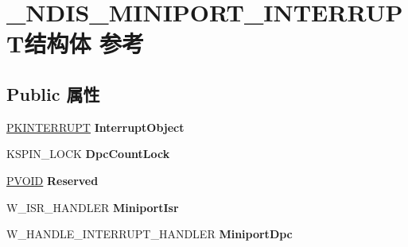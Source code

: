 \hypertarget{struct___n_d_i_s___m_i_n_i_p_o_r_t___i_n_t_e_r_r_u_p_t}{}\section{\+\_\+\+N\+D\+I\+S\+\_\+\+M\+I\+N\+I\+P\+O\+R\+T\+\_\+\+I\+N\+T\+E\+R\+R\+U\+P\+T结构体 参考}
\label{struct___n_d_i_s___m_i_n_i_p_o_r_t___i_n_t_e_r_r_u_p_t}
\subsection*{Public 属性}
\begin{DoxyCompactItemize}
\item 
\mbox{\label{struct___n_d_i_s___m_i_n_i_p_o_r_t___i_n_t_e_r_r_u_p_t_a1f5610ced4ffe9214dae93efdd539435}} 
\hyperlink{struct___k_i_n_t_e_r_r_u_p_t}{P\+K\+I\+N\+T\+E\+R\+R\+U\+PT} {\bfseries Interrupt\+Object}
\item 
\mbox{\label{struct___n_d_i_s___m_i_n_i_p_o_r_t___i_n_t_e_r_r_u_p_t_a2ee97a993517ab071be3ca7f34240564}} 
K\+S\+P\+I\+N\+\_\+\+L\+O\+CK {\bfseries Dpc\+Count\+Lock}
\item 
\mbox{\label{struct___n_d_i_s___m_i_n_i_p_o_r_t___i_n_t_e_r_r_u_p_t_a3fd627ef36f4faa19054d4b81a6c8dc6}} 
\hyperlink{interfacevoid}{P\+V\+O\+ID} {\bfseries Reserved}
\item 
\mbox{\label{struct___n_d_i_s___m_i_n_i_p_o_r_t___i_n_t_e_r_r_u_p_t_a2b27989bb9aec2fb87fb63fbceaca278}} 
W\+\_\+\+I\+S\+R\+\_\+\+H\+A\+N\+D\+L\+ER {\bfseries Miniport\+Isr}
\item 
\mbox{\label{struct___n_d_i_s___m_i_n_i_p_o_r_t___i_n_t_e_r_r_u_p_t_ab35e66aa1c451a9b270fd12635427f21}} 
W\+\_\+\+H\+A\+N\+D\+L\+E\+\_\+\+I\+N\+T\+E\+R\+R\+U\+P\+T\+\_\+\+H\+A\+N\+D\+L\+ER {\bfseries Miniport\+Dpc}
\item 
\mbox{\label{struct___n_d_i_s___m_i_n_i_p_o_r_t___i_n_t_e_r_r_u_p_t_a45a4298dce8cd36f91bc8c4fc0d8ebbf}} 

\end{DoxyCompactItemize}
